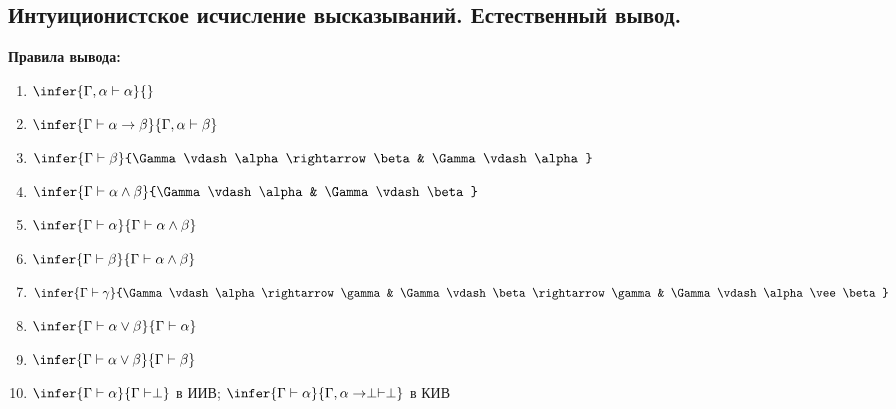 \documentclass{article}
\begin{document}
	\subsection{Интуиционистское исчисление высказываний. Естественный вывод.}
	\textbf{Правила вывода:}
	\begin{enumerate}
		\item $\infer{\Gamma, \alpha \vdash \alpha}{}$
		\item $\infer{\Gamma \vdash \alpha \rightarrow \beta}{\Gamma, \alpha \vdash \beta}$
		\item $\infer{\Gamma \vdash \beta}{\Gamma \vdash \alpha \rightarrow \beta & \Gamma \vdash \alpha}$
		\item $\infer{\Gamma \vdash \alpha \wedge \beta}{\Gamma \vdash \alpha & \Gamma \vdash \beta}$
		\item $\infer{\Gamma \vdash \alpha}{\Gamma \vdash \alpha \wedge \beta}$
		\item $\infer{\Gamma \vdash \beta}{\Gamma \vdash \alpha \wedge \beta}$
		\item $\infer{\Gamma \vdash \gamma}{\Gamma \vdash \alpha \rightarrow \gamma & \Gamma \vdash \beta \rightarrow \gamma & \Gamma \vdash \alpha \vee \beta}$
		\item $\infer{\Gamma \vdash \alpha \vee \beta}{\Gamma \vdash \alpha}$
		\item $\infer{\Gamma \vdash \alpha \vee \beta}{\Gamma \vdash \beta}$
		\item $\infer{\Gamma \vdash \alpha}{\Gamma \vdash \perp}$ в ИИВ; $\infer{\Gamma \vdash \alpha}{\Gamma, \alpha \rightarrow \perp \vdash \perp}$ в КИВ
	\end{enumerate}
\end{document}
